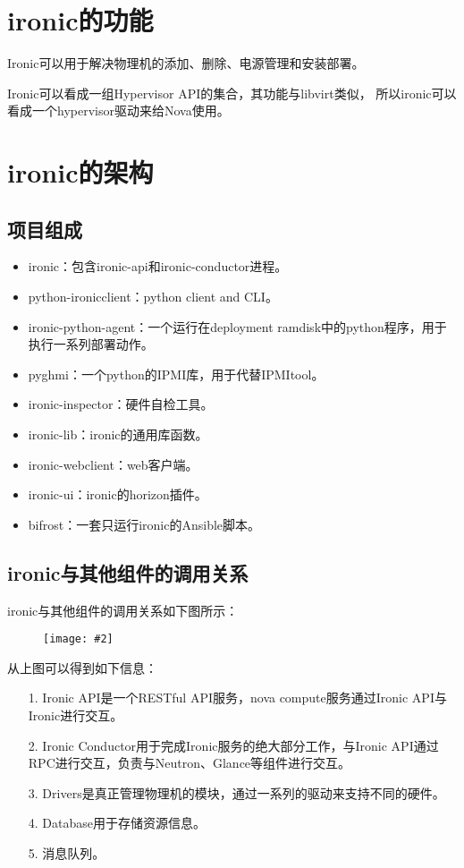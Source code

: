 \documentclass[a4paper,left=2.5cm,right=2.5cm,11pt]{article}
\newcommand{\sizedfic}[2]{\begin{figure}[H]
		\center
		\texttt{[image: \#2]}
	\end{figure}}
\begin{document}
\tableofcontents

\clearpage

\section{ironic的功能}
	Ironic可以用于解决物理机的添加、删除、电源管理和安装部署。\par
	Ironic可以看成一组Hypervisor API的集合，其功能与libvirt类似，
	所以ironic可以看成一个hypervisor驱动来给Nova使用。

\section{ironic的架构}
\subsection{项目组成}
	\begin{itemize}
		\item ironic：包含ironic-api和ironic-conductor进程。
		\item python-ironicclient：python client and CLI。
		\item ironic-python-agent：一个运行在deployment ramdisk中的python程序，用于执行一系列部署动作。
		\item pyghmi：一个python的IPMI库，用于代替IPMItool。
		\item ironic-inspector：硬件自检工具。
		\item ironic-lib：ironic的通用库函数。
		\item ironic-webclient：web客户端。
		\item ironic-ui：ironic的horizon插件。
		\item bifrost：一套只运行ironic的Ansible脚本。
	\end{itemize}

\clearpage

\subsection{ironic与其他组件的调用关系}
	ironic与其他组件的调用关系如下图所示：
	\sizedfic{0.9}{1.png}

	从上图可以得到如下信息：
	\begin{itemize}
		\item[1.] Ironic API是一个RESTful API服务，nova compute服务通过Ironic API与Ironic进行交互。
		\item[2.] Ironic Conductor用于完成Ironic服务的绝大部分工作，与Ironic API通过RPC进行交互，负责与Neutron、Glance等组件进行交互。
		\item[3.] Drivers是真正管理物理机的模块，通过一系列的驱动来支持不同的硬件。
		\item[4.] Database用于存储资源信息。
		\item[5.] 消息队列。
	\end{itemize}
\end{document}
